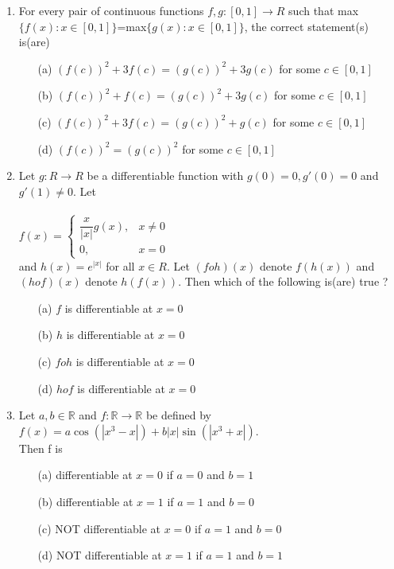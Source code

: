 \begin{enumerate}[label=\arabic*.,ref=\thesubsection.\theenumi]
\item For every pair of continuous functions $f,g:[0,1] \to R$ such that max$\{f(x):x \in [0,1]\}$=max$\{g(x):x \in [0,1]\}$, the correct statement(s) is(are)
\begin{itemize}
\item[(a)] $(f(c))^2+3f(c)=(g(c))^2+3g(c)$ for some $c \in [0,1]$\\
\item[(b)] $(f(c))^2+f(c)=(g(c))^2+3g(c)$ for some $c \in [0,1]$\\
\item[(c)] $(f(c))^2+3f(c)=(g(c))^2+g(c)$ for some $c \in [0,1]$\\
\item[(d)] $(f(c))^2=(g(c))^2$ for some $c \in [0,1]$\\
\end{itemize}

\item Let $g:R \to R$ be a differentiable function with $g(0)=0, g'(0)=0$ and $g'(1)\neq 0$. Let \\ \\$f(x)=\begin{cases}
\dfrac{x}{|x|}g(x), & \text{$x\neq 0$}\\
0, & \text{$x=0$}
\end{cases}$ \\ and $h(x)=e^{|x|}$ for all $x \in R$. Let $(foh)(x)$ denote $f(h(x))$ and $(hof)(x)$ denote $h(f(x))$. Then which of the following is(are) true ?
\begin{itemize}
\item[(a)] $f$ is differentiable at $x=0$
\item[(b)] $h$ is differentiable at $x=0$
\item[(c)] $foh$ is differentiable at $x=0$
\item[(d)] $hof$ is differentiable at $x=0$
\end{itemize}

\item Let $a, b\in\mathbb{R}$ and $f:\mathbb{R}\to\mathbb{R}$ be defined by \\ $f(x)=a\cos (|x^3-x|)+b|x|\sin(|x^3+x|)$.\\ Then f is
\begin{itemize}
\item[(a)] differentiable at $x=0$ if $a=0$ and $b=1$
\item[(b)] differentiable at $x=1$ if $a=1$ and $b=0$
\item[(c)] NOT differentiable at $x=0$ if $a=1$ and $b=0$
\item[(d)] NOT differentiable at $x=1$ if $a=1$ and $b=1$\\
\end{itemize}


\end{enumerate}
